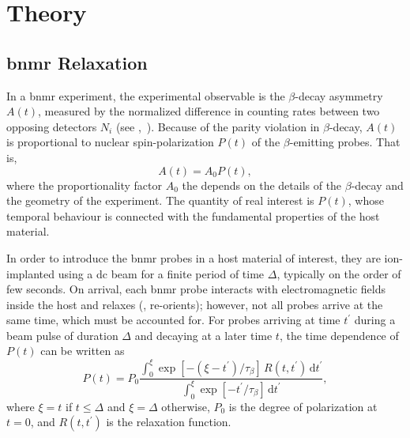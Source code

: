 \section{Theory \label{sec:theory}}

\subsection{\gls{bnmr} Relaxation}
In a \gls{bnmr} experiment, the experimental observable is the $\beta$-decay asymmetry $A(t)$, measured by the normalized difference in counting rates between two opposing detectors $N_{i}$ (see ,~\cite{1983-Ackermann-TCP-31-291, 2015-MacFarlane-SSNMR-68-1}).
Because of the parity violation in $\beta$-decay, $A(t)$ is proportional to nuclear spin-polarization $P(t)$ of the $\beta$-emitting probes.
That is,
\begin{equation}
   A(t) = A_{0} P(t),
\end{equation}
where the proportionality factor $A_{0}$ the depends on the details of the $\beta$-decay and the geometry of the experiment.
The quantity of real interest is $P(t)$, whose temporal behaviour is connected with the fundamental properties of the host material.

In order to introduce the \gls{bnmr} probes in a host material of interest, they are ion-implanted using a \gls{dc} beam for a finite period of time $\Delta$, typically on the order of few seconds.
On arrival, each \gls{bnmr} probe interacts with electromagnetic fields inside the host and relaxes (, re-orients);
however, not all probes arrive at the same time, which must be accounted for.
For probes arriving at time $t^{\prime}$ during a beam pulse of duration $\Delta$ and decaying at a later time $t$, the time dependence of $P(t)$ can be written as~\cite{2006-Salman-PRL-96-147601, 2015-MacFarlane-PRB-92-064409}
%
\begin{equation} \label{eq:polarization}
P(t) = P_0 \frac{ \displaystyle \int_{0}^{\xi} \exp \left [ -\left (\xi - t^{\prime} \right ) / \tau_{\beta} \right ] \, R \left (t,t^{\prime} \right ) \, \mathrm{d}t^{\prime} }{ \displaystyle \int_{0}^{\xi} \exp \left [ -t^{\prime} / \tau_{\beta} \right ] \, \mathrm{d}t^{\prime} },
\end{equation}
%
where $\xi = t$ if $t \leq \Delta$ and $\xi = \Delta$ otherwise, $P_{0}$ is the degree of polarization at $t = 0$, and $R \left (t, t^{\prime} \right )$ is the relaxation function.

